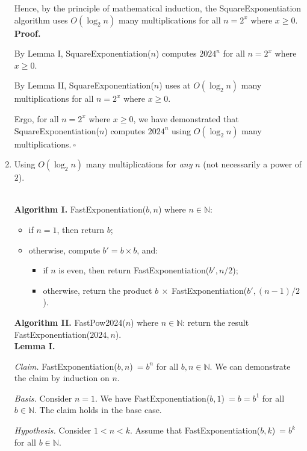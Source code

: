 \begin{enumerate}
\begin{solution}
Hence, by the principle of mathematical induction, the {\sc SquareExponentiation} algorithm uses $O(\log_2n)$ many multiplications for all $n=2^x$ where $x\geq 0$.\\

\textbf{Proof. }

By Lemma I, {\sc SquareExponentiation}($n$) computes $2024^n$ for all $n=2^x$ where $x\geq 0$.

By Lemma II, {\sc SquareExponentiation}($n$) uses at $O(\log_2n)$ many multiplications for all $n=2^x$ where $x\geq 0$.

Ergo, for all $n=2^x$ where $x\geq 0$, we have demonstrated that {\sc SquareExponentiation}($n$) computes $2024^n$ using $O(\log_2n)$ many multiplications.$~\square$
\end{solution}
\newpage
\item Using $O(\log_2 n)$ many multiplications for \emph{any} $n$ (not necessarily a power of $2$).
\begin{solution}\\

\textbf{Algorithm I. }{\sc FastExponentiation}($b,n$) where $n\in\mathbb{N}$:
\begin{itemize}
\item if $n=1$, then return $b$;
\item otherwise, compute $b'=b\times b$, and:
\begin{itemize}
    \item if $n$ is even, then return {\sc FastExponentiation}($b',n/2$);
    \item otherwise, return the product $b~\times~${\sc FastExponentiation}($b',(n-1)/2$).
\end{itemize}
\end{itemize}

\textbf{Algorithm II. }{\sc FastPow2024($n$)} where $n\in\mathbb{N}$: return the result {\sc FastExponentiation}($2024,n$).\\

\textbf{Lemma I.}

\textit{Claim. }{\sc FastExponentiation}($b,n$)$~=b^n$ for all $b,n\in\mathbb{N}$. We can demonstrate the claim by induction on $n$.

\textit{Basis. }Consider $n=1$. We have {\sc FastExponentiation}($b,1$)$~=b=b^1$ for all $b\in\mathbb{N}$. The claim holds in the base case.

\textit{Hypothesis. }Consider $1<n<k$. Assume that {\sc FastExponentiation}($b,k$)$~=b^k$ for all $b\in\mathbb{N}$.


\end{solution}
\end{enumerate}
